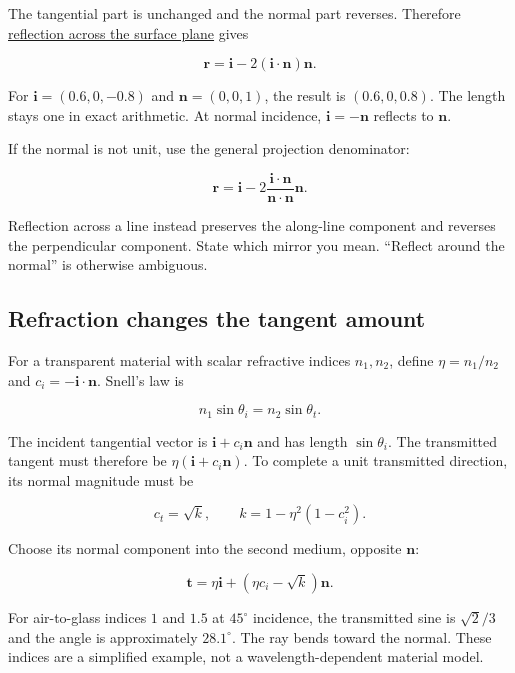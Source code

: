 The tangential part is unchanged and the normal part reverses. Therefore \hyperref[01-foundations-i-ch018-light-uses-the-same-decomposition-in-a-new-role]{reflection across the surface plane} gives

\[
\mathbf r=\mathbf i-2(\mathbf i\cdot\mathbf n)\mathbf n.
\]

For \(\mathbf i=(0.6,0,-0.8)\) and \(\mathbf n=(0,0,1)\), the result is \((0.6,0,0.8)\). The length stays one in exact arithmetic. At normal incidence, \(\mathbf i=-\mathbf n\) reflects to \(\mathbf n\).

If the normal is not unit, use the general projection denominator:

\[
\mathbf r=\mathbf i-2\frac{\mathbf i\cdot\mathbf n}{\mathbf n\cdot\mathbf n}\mathbf n.
\]

Reflection across a line instead preserves the along-line component and reverses the perpendicular component. State which mirror you mean. ``Reflect around the normal'' is otherwise ambiguous.

\subsection{Refraction changes the tangent amount}\label{01-foundations-i-ch018-refraction-changes-the-tangent-amount}

\hypertarget{01-foundations-i-ch018-refraction-changes-the-tangent-amount}{}

For a transparent material with scalar refractive indices \(n_1,n_2\), define \(\eta=n_1/n_2\) and \(c_i=-\mathbf i\cdot\mathbf n\). Snell's law is

\[
n_1\sin\theta_i=n_2\sin\theta_t.
\]

The incident tangential vector is \(\mathbf i+c_i\mathbf n\) and has length \(\sin\theta_i\). The transmitted tangent must therefore be \(\eta(\mathbf i+c_i\mathbf n)\). To complete a unit transmitted direction, its normal magnitude must be

\[
c_t=\sqrt{k},\qquad k=1-\eta^2(1-c_i^2).
\]

Choose its normal component into the second medium, opposite \(\mathbf n\):

\[
\mathbf t=\eta\mathbf i+(\eta c_i-\sqrt{k})\mathbf n.
\]

For air-to-glass indices \(1\) and \(1.5\) at \(45^\circ\) incidence, the transmitted sine is \(\sqrt2/3\) and the angle is approximately \(28.1^\circ\). The ray bends toward the normal. These indices are a simplified example, not a wavelength-dependent material model.

